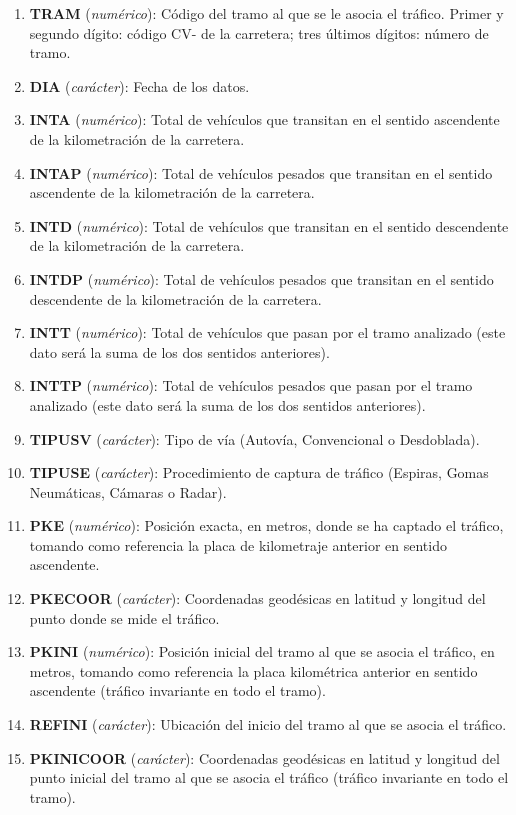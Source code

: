 \documentclass[notspecified,article,submit,moreauthors,pdftex]{Definitions/mdpi}
\begin{document}
\begin{enumerate}
\item \textbf{TRAM} (\textit{numérico}): Código del tramo al que se le asocia el tráfico.
\subitem  Primer y segundo dígito: código CV- de la carretera; tres últimos dígitos: número de tramo.
\item \textbf{DIA} (\textit{carácter}): Fecha de los datos.
\item \textbf{INTA} (\textit{numérico}): Total de vehículos que transitan en el sentido ascendente de la kilometración de la carretera.
\item \textbf{INTAP} (\textit{numérico}): Total de vehículos pesados que transitan en el sentido ascendente de la kilometración de la carretera.
\item \textbf{INTD} (\textit{numérico}): Total de vehículos que transitan en el sentido descendente de la kilometración de la carretera.
\item \textbf{INTDP} (\textit{numérico}): Total de vehículos pesados que transitan en el sentido descendente de la kilometración de la carretera.
\item \textbf{INTT} (\textit{numérico}): Total de vehículos que pasan por el tramo analizado (este dato será la suma de los dos sentidos anteriores).
\item \textbf{INTTP} (\textit{numérico}): Total de vehículos pesados que pasan por el tramo analizado (este dato será la suma de los dos sentidos anteriores).
\item \textbf{TIPUSV} (\textit{carácter}): Tipo de vía (Autovía, Convencional o Desdoblada).
\item \textbf{TIPUSE} (\textit{carácter}): Procedimiento de captura de tráfico (Espiras, Gomas Neumáticas, Cámaras o Radar).
\item \textbf{PKE} (\textit{numérico}): Posición exacta, en metros, donde se ha captado el tráfico, tomando como referencia la placa de kilometraje anterior en sentido ascendente.
\item \textbf{PKECOOR} (\textit{carácter}): Coordenadas geodésicas en latitud y longitud del punto donde se mide el tráfico.
\item \textbf{PKINI} (\textit{numérico}): Posición inicial del tramo al que se asocia el tráfico, en metros, tomando como referencia la placa kilométrica anterior en sentido ascendente (tráfico invariante en todo el tramo).
\item \textbf{REFINI} (\textit{carácter}): Ubicación del inicio del tramo al que se asocia el tráfico.
\item \textbf{PKINICOOR} (\textit{carácter}): Coordenadas geodésicas en latitud y longitud del punto inicial del tramo al que se asocia el tráfico (tráfico invariante en todo el tramo).

\end{enumerate}
\end{document}
